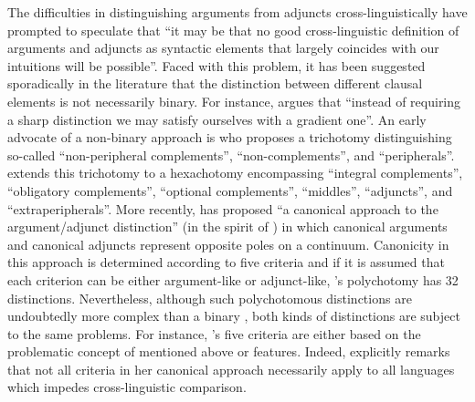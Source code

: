 The difficulties in distinguishing arguments from adjuncts cross-linguistically have prompted \cite[4]{haspelmath:2014} to speculate that “it may be that no good cross-linguistic definition of arguments and adjuncts as syntactic elements that largely coincides with our intuitions will be possible”. Faced with this problem, it has been suggested sporadically in the literature that the distinction between different clausal elements is not necessarily binary. For instance, \cite[1]{wichmann:2014} argues that “instead of requiring a sharp distinction we may satisfy ourselves with a gradient one”. An early advocate of a non-binary approach is \cite[140f.]{matthews:1981} who proposes a trichotomy distinguishing so-called “non-peripheral complements”, “non-complements”, and “peripherals”. \cite[524]{somers:1984} extends this trichotomy to a hexachotomy encompassing “integral complements”, “obligatory complements”, “optional complements”, “middles”, “adjuncts”, and “extraperipherals”. More recently, \cite{forker:2014} has proposed “a canonical approach to the argument/adjunct distinction” (in the spirit of \citealt{corbett:2005, corbett:2007, corbett:2013, brown:al:2013}) in which canonical arguments and canonical adjuncts represent opposite poles on a continuum. Canonicity in this approach is determined according to five criteria \citep[28ff.]{forker:2014} and if it is assumed that each criterion can be either argument-like or adjunct-like, \citeauthor{forker:2014}’s polychotomy has 32 distinctions. Nevertheless, although such polychotomous distinctions are undoubtedly more complex than a binary , both kinds of distinctions are subject to the same problems. For instance, \citeauthor{forker:2014}’s five criteria are either based on the problematic concept of  mentioned above \citep[46ff.]{haspelmath:hartmann:2015} or  features. Indeed, \cite[36]{forker:2014} explicitly remarks that not all criteria in her canonical approach necessarily apply to all languages which impedes cross-linguistic comparison.

